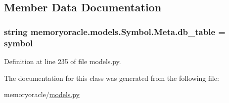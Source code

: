 \subsection{Member Data Documentation}
\hypertarget{classmemoryoracle_1_1models_1_1Symbol_1_1Meta_aa24c6d1bcbc301096a6ff2bd119e8ac8}{}
\subsubsection[{db\+\_\+table}]{\setlength{\rightskip}{0pt plus 5cm}string memoryoracle.\+models.\+Symbol.\+Meta.\+db\+\_\+table = \textquotesingle{}symbol\textquotesingle{}\hspace{0.3cm}{\ttfamily [static]}}\label{classmemoryoracle_1_1models_1_1Symbol_1_1Meta_aa24c6d1bcbc301096a6ff2bd119e8ac8}


Definition at line 235 of file models.\+py.



The documentation for this class was generated from the following file\+:\begin{DoxyCompactItemize}
\item 
memoryoracle/\hyperlink{models_8py}{models.\+py}\end{DoxyCompactItemize}
